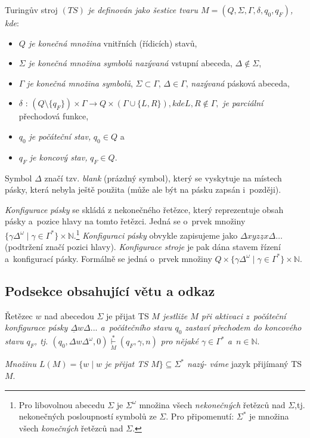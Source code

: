 \documentclass[a4paper, 11pt, twocolumn] {article}
\begin{document}
\begin{definition} \label{def1} Turingův stroj $(TS)$ \textit{je definován jako šestice
tvaru $M = (Q,\Sigma,\Gamma,\delta,q_0,q_F)$, kde}:
\end{definition}
\begin{itemize}
\item \textit {$Q$ je konečná množina} vnitřních (řídicích) stavů,
\item $\Sigma$ \textit {je konečná množina symbolů nazývaná} vstupní abeceda, $\Delta \notin \Sigma$,
\item $\Gamma$ \textit {je konečná množina symbolů}, $\Sigma \subset \Gamma$, $\Delta \in \Gamma$, \textit{nazývaná} pásková abeceda,
\item $\delta$ : $(Q\setminus\{q_F\})\times\Gamma\rightarrow Q\times(\Gamma\cup\{L,R\}),kde L,R\notin\Gamma,$ \textit{je parciální} přechodová funkce,
\item $q_0$ \textit{je počáteční stav,} $q_0 \in Q$ a
\item $q_F$ \textit{je koncový stav,} $q_F \in Q$.
\end{itemize}

Symbol $\Delta$ značí tzv. \textit{blank} (prázdný symbol), který 
se vyskytuje na místech pásky, která nebyla ještě použita
(může ale být na pásku zapsán i~později).
\par\textit{Konfigurace} \textit{pásky} se skládá z nekonečného řetězce,
který reprezentuje obsah pásky a~pozice hlavy na tomto
řetězci. Jedná se o~prvek množiny $\{\gamma\Delta^\omega\mid\gamma\in\Gamma^*\}\times\mathbb{N}$.\footnote{Pro libovolnou abecedu $\Sigma$ je $\Sigma^\omega$ množina všech\textit{ nekonečných} řetězců nad $\Sigma$,tj. nekonečných posloupností symbolů ze $\Sigma$. Pro připomenutí: $\Sigma^*$ je množina všech \textit{konečných} řetězců nad $\Sigma$.} \textit{Konfiguraci pásky} obvykle zapisujeme jako $\Delta xyz \underline{z}x\Delta \ldots$
(podtržení značí pozici hlavy). \textit{Konfigurace stroje} je pak
dána stavem řízení a~konfigurací pásky. Formálně se jedná
o~prvek množiny $Q\times\{\gamma\Delta^\omega\mid\gamma\in\Gamma^*\}\times\mathbb{N}$.

\subsection{Podsekce obsahující větu a odkaz}
\begin{definition}
\label{def:Definice2}
Řetězec $w$ nad abecedou $\Sigma$ je přijat TS \textit{$M$ jestliže $M$ při aktivaci z~počáteční konfigurace pásky $\underline{\Delta}w\Delta...$ a~počátečního stavu $q_0$ zastaví přechodem do koncového stavu $q_F$, tj. $(q_0,\Delta w\Delta^\omega,0)\underset{M}{\overset{*}{\vdash}}(q_F,\gamma,n)$ pro
nějaké $\gamma\in\Gamma^* $ a~$n \in\mathbb{N}$}.
\par\textit{Množinu $L(M) = \{w\mid w$ je přijat TS $M\} \subseteq\Sigma^*$ nazý-
váme} jazyk přijímaný TS $M$.
\end{definition}
\end{document}
